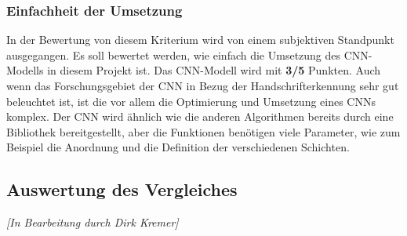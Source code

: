 \subsubsection{Einfachheit der Umsetzung}
In der Bewertung von diesem Kriterium wird von einem subjektiven Standpunkt ausgegangen. Es soll bewertet werden, wie einfach die Umsetzung des CNN-Modells in diesem Projekt ist.
Das CNN-Modell wird mit \textbf{3/5} Punkten.
Auch wenn das Forschungsgebiet der CNN in Bezug der Handschrifterkennung sehr gut beleuchtet ist, ist die vor allem die Optimierung und Umsetzung eines CNNs komplex.
Der CNN wird ähnlich wie die anderen Algorithmen bereits durch eine Bibliothek bereitgestellt, aber die Funktionen benötigen viele Parameter, wie zum Beispiel die Anordnung und die Definition der verschiedenen Schichten.
\newpage

\subsection{Auswertung des Vergleiches} \label{ssec:eval}
\textit{[In Bearbeitung durch Dirk Kremer]}
